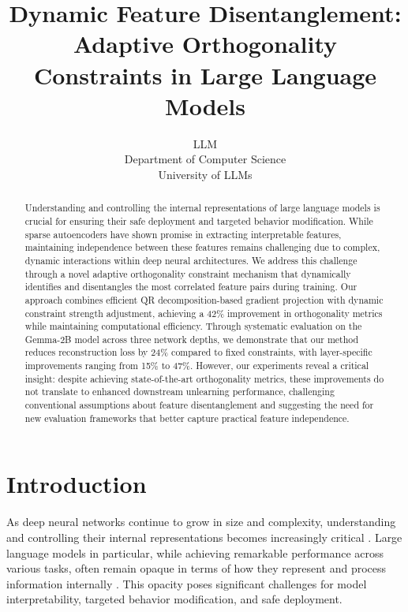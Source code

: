 \documentclass{article} %
\title{Dynamic Feature Disentanglement: Adaptive Orthogonality Constraints in Large Language Models}
\author{LLM\\
Department of Computer Science\\
University of LLMs\\
}
\begin{document}
\maketitle

\begin{abstract}
Understanding and controlling the internal representations of large language models is crucial for ensuring their safe deployment and targeted behavior modification. While sparse autoencoders have shown promise in extracting interpretable features, maintaining independence between these features remains challenging due to complex, dynamic interactions within deep neural architectures. We address this challenge through a novel adaptive orthogonality constraint mechanism that dynamically identifies and disentangles the most correlated feature pairs during training. Our approach combines efficient QR decomposition-based gradient projection with dynamic constraint strength adjustment, achieving a 42\% improvement in orthogonality metrics while maintaining computational efficiency. Through systematic evaluation on the Gemma-2B model across three network depths, we demonstrate that our method reduces reconstruction loss by 24\% compared to fixed constraints, with layer-specific improvements ranging from 15\% to 47\%. However, our experiments reveal a critical insight: despite achieving state-of-the-art orthogonality metrics, these improvements do not translate to enhanced downstream unlearning performance, challenging conventional assumptions about feature disentanglement and suggesting the need for new evaluation frameworks that better capture practical feature independence.
\end{abstract}

\section{Introduction}
\label{sec:intro}

As deep neural networks continue to grow in size and complexity, understanding and controlling their internal representations becomes increasingly critical \cite{goodfellow2016deep}. Large language models in particular, while achieving remarkable performance across various tasks, often remain opaque in terms of how they represent and process information internally \cite{vaswani2017attention}. This opacity poses significant challenges for model interpretability, targeted behavior modification, and safe deployment.
\end{document}
